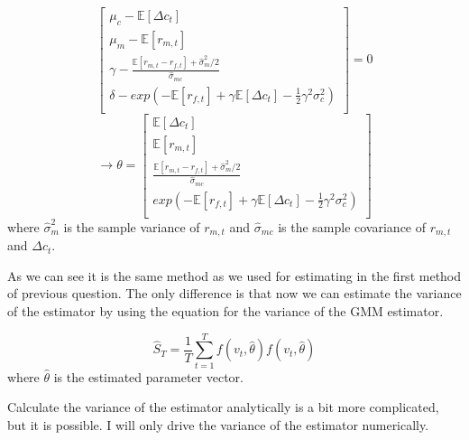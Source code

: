 \begin{enumerate}[(a)]
\begin{equation*}
\begin{bmatrix}
          \mu_c - \mathbb{E} [\Delta c_t] \\
          \mu_m - \mathbb{E} [r_{m,t}] \\
          \gamma - \frac{\mathbb{E} [r_{m,t}- r_{f,t}] + \hat{\sigma}_m^2/2}{\hat{\sigma}_{mc} } \\
          \delta - exp(- \mathbb{E} [r_{f,t}] + \gamma\mathbb{E} [\Delta c_t] - \frac{1}{2}\gamma^2 \sigma_c^2 )  \\
        \end{bmatrix} = 0
      \end{equation*}
      \begin{equation*}
        \rightarrow  \theta = \begin{bmatrix}
          \mathbb{E} [\Delta c_t] \\
          \mathbb{E} [r_{m,t}] \\
          \frac{\mathbb{E} [r_{m,t}- r_{f,t}] + \hat{\sigma}_m^2/2}{\hat{\sigma}_{mc} } \\
          exp(- \mathbb{E} [r_{f,t}] + \gamma\mathbb{E} [\Delta c_t] - \frac{1}{2}\gamma^2 \sigma_c^2 )  \\
        \end{bmatrix}
      \end{equation*}
      where $\hat{\sigma}_m^2$ is the sample variance of $r_{m,t}$ and $\hat{\sigma}_{mc}$ is the sample covariance of $r_{m,t}$ and $\Delta c_t$.

      As we can see it is the same method as we used for estimating in the first method of previous question. The only difference is that now we can estimate the variance of the estimator by using the equation for the variance of the GMM estimator.
    
      \begin{equation*}
        \hat{S}_T = \frac{1}{T} \sum_{t=1}^T f(v_t,\hat{\theta})f(v_t,\hat{\theta})
      \end{equation*}
      where $\hat{\theta}$ is the estimated parameter vector. 

      Calculate the variance of the estimator analytically is a bit more complicated, but it is possible. I will only drive the variance of the estimator numerically.


\end{enumerate}
